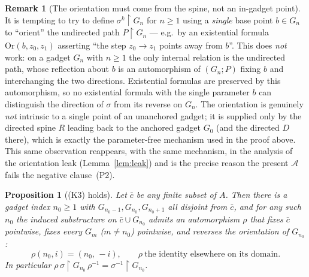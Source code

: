 \documentclass[12pt,fullpage]{article}
\newtheorem{proposition}[theorem]{Proposition}
\theoremstyle{definition}
\newtheorem{remark}[theorem]{Remark}
\newcommand{\A}{\mathcal{A}}
\begin{document}
\begin{remark}[The orientation must come from the spine, not an in-gadget point]\label{rem:K2-honest}
It is tempting to try to define $\sigma^k\restriction G_n$ for $n\ge1$ using a
\emph{single} base point $b\in G_n$ to ``orient'' the undirected path
$P\restriction G_n$ --- e.g.\ by an existential formula
$\mathrm{Or}(b,z_0,z_1)$ asserting ``the step $z_0\to z_1$ points away from
$b$''.  This does \emph{not} work: on a gadget $G_n$ with $n\ge1$ the only
internal relation is the undirected path, whose reflection about $b$ is an
automorphism of $(G_n;P)$ fixing $b$ and interchanging the two directions.
Existential formulas are preserved by this automorphism, so no existential
formula with the single parameter $b$ can distinguish the direction of $\sigma$
from its reverse on $G_n$.  The orientation is genuinely \emph{not}
intrinsic to a single point of an unanchored gadget; it is supplied only by the
directed spine $R$ leading back to the anchored gadget $G_0$ (and the directed
$D$ there), which is exactly the parameter-free mechanism used in the proof
above.  This same observation reappears, with the same mechanism, in the
analysis of the orientation leak (Lemma~\ref{lem:leak}) and is the precise
reason the present $\A$ fails the negative clause~(P2).
\end{remark}

\begin{proposition}[(K3) holds]\label{prop:K3}
Let $\bar c$ be any finite subset of $A$.  Then there is a gadget index
$n_0\ge 1$ with $G_{n_0-1},G_{n_0},G_{n_0+1}$ all disjoint from $\bar c$, and
for any such $n_0$ the induced substructure on $\bar c\cup G_{n_0}$ admits an
automorphism $\rho$ that fixes $\bar c$ pointwise, fixes every
$G_m$ ($m\ne n_0$) pointwise, and reverses the orientation of $G_{n_0}$:
\[
\rho(n_0,i)=(n_0,\,-i),\qquad \rho\ \text{the identity elsewhere on its domain.}
\]
In particular $\rho\,\sigma\restriction G_{n_0}\,\rho^{-1}=
\sigma^{-1}\restriction G_{n_0}$.
\end{proposition}
\end{document}
